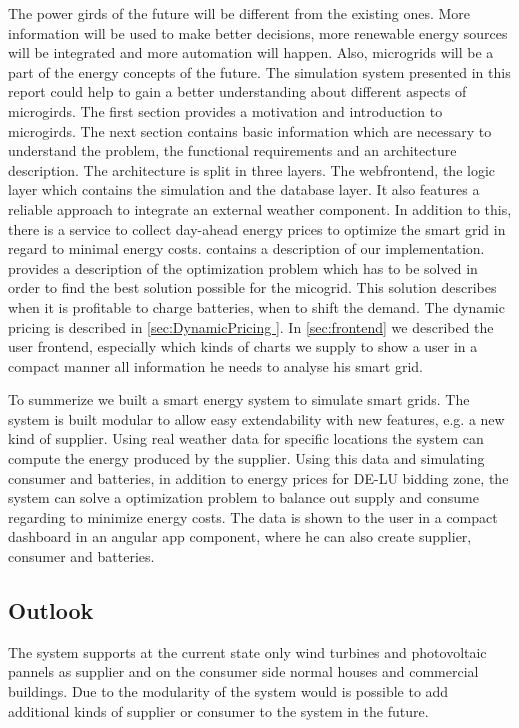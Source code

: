 The power girds of the future will be different from the existing ones. More information will be used to make better decisions, more renewable energy sources will be integrated and more automation will happen.
Also, microgrids will be a part of the energy concepts of the future.
The simulation system presented in this report could help to gain a better understanding about different aspects of microgirds. 
The first section provides a motivation and introduction to microgirds. 
The next section contains basic information which are necessary to understand the problem, the functional requirements and an architecture description.
The architecture is split in three layers. 
The webfrontend, the logic layer which contains the simulation and the database layer.
It also features a reliable approach to integrate an external weather component.
In addition to this, there is a service to collect day-ahead energy prices to optimize the smart grid in regard to minimal energy costs. 
 contains a description of our implementation.
 provides a description of the optimization problem which has to be solved in order to find the best solution possible for the micogrid. 
This solution describes when it is profitable to charge batteries, when to shift the demand.
The dynamic pricing is described in \cref{sec:DynamicPricing }.
In \cref{sec:frontend} we described the user frontend, especially which kinds of charts we supply to show a user in a compact manner all information he needs to analyse his smart grid.

To summerize we built a smart energy system to simulate smart grids.
The system is built modular to allow easy extendability with new features, e.g. a new kind of supplier.
Using real weather data for specific locations the system can compute the energy produced by the supplier.
Using this data and simulating consumer and batteries, in addition to energy prices for DE-LU bidding zone, the system can solve a optimization problem to balance out supply and consume regarding to minimize energy costs.
The data is shown to the user in a compact dashboard in an angular app component, where he can also create supplier, consumer and batteries.

\subsection{Outlook}
The system supports at the current state only wind turbines and photovoltaic pannels as supplier and on the consumer side normal houses and commercial buildings.
Due to the modularity of the system would is possible to add additional kinds of supplier or consumer to the system in the future.

